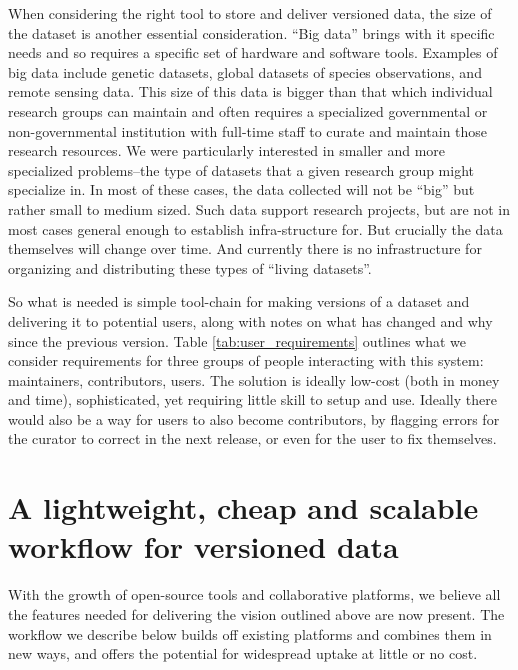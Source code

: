 \documentclass[a4paper,11pt]{article}
\begin{document}
When considering the right tool to store and deliver versioned data, the size
of the dataset is another essential consideration. ``Big data'' brings with it
specific needs and so requires a specific set of hardware and software tools.
Examples of big data include genetic datasets, global datasets of species
observations, and remote sensing data. This size of this data is bigger than
that which individual research groups can maintain and often requires a
specialized governmental or non-governmental institution with full-time staff
to curate and maintain those research resources. We were particularly
interested in smaller and more specialized problems--the type of datasets that
a given research group might specialize in. In most of these cases, the data
collected will not be ``big'' but rather small to medium sized. Such data
support research projects, but are not in most cases general enough to
establish infra-structure for. But crucially the data themselves will change
over time. And currently there is no infrastructure for organizing and
distributing these types of ``living datasets''.

So what is needed is simple tool-chain for
making versions of a dataset and delivering it to potential users, along
with notes on what has changed and why since the previous version.
Table \ref{tab:user_requirements} outlines what we consider requirements for
three groups of people interacting with this system: maintainers,
contributors, users. The solution is ideally low-cost (both in money and
time), sophisticated, yet requiring little skill to setup and use.  Ideally
there would also be a way for users to also become contributors, by flagging
errors for the curator to correct in the next release, or even for the user to
fix themselves.


\section{A lightweight, cheap and scalable workflow for versioned data}

With the growth of open-source tools and collaborative platforms, we believe
all the features needed for delivering the vision outlined above are now
present. The workflow we describe below builds off existing platforms and
combines them in new ways, and offers the potential for
widespread uptake at little or no cost.
\end{document}
